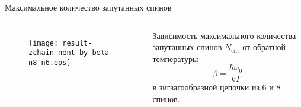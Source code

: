 \begin{frame}{Максимальное количество запутанных спинов}
  \begin{columns}
     \begin{figure}
     \texttt{[image: result-zchain-nent-by-beta-n8-n6.eps]}
     \caption{}
     \end{figure}

     \begin{block}{}
       Зависимость максимального количества запутанных спинов $N_\mathrm{ent}$ от обратной температуры
       $$ \beta = \dfrac{\hbar\omega_0}{kT} $$
       в зигзагообразной цепочки из 6 и 8 спинов.
    \end{block}
  \end{columns}
\end{frame}
